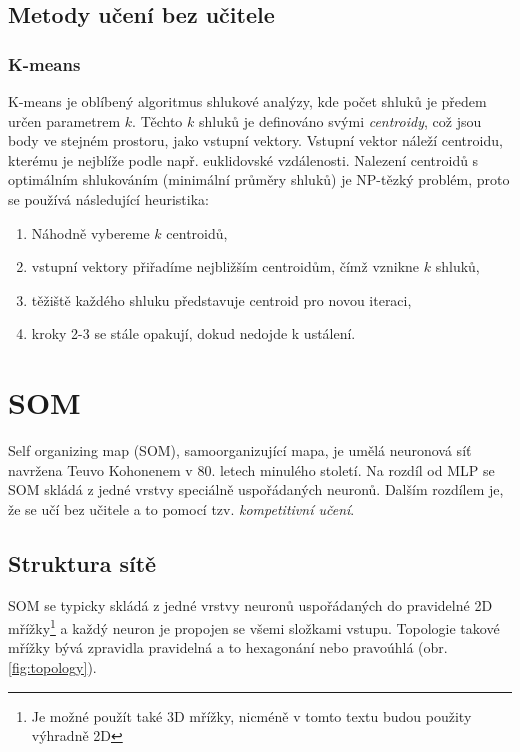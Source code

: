 \documentclass[thesis=M,czech]{FITthesis}[2012/06/26]
\begin{document}
 
 \subsection{Metody učení bez učitele}

  \subsubsection*{K-means}

K-means je oblíbený algoritmus shlukové analýzy, kde počet shluků je předem určen parametrem $k$. Těchto $k$ shluků je definováno svými \textit{centroidy}, což jsou body ve stejném prostoru, jako vstupní vektory. Vstupní vektor náleží centroidu, kterému je nejblíže podle např. euklidovské vzdálenosti. Nalezení centroidů s optimálním shlukováním (minimální průměry shluků) je NP-tězký problém\cite{k-means-nphard}, proto se  používá následující heuristika\cite{k-means-algo}:

\begin{enumerate}
\item Náhodně vybereme $k$ centroidů,
\item  vstupní vektory přiřadíme nejbližším centroidům, čímž vznikne $k$ shluků,
\item těžiště každého shluku představuje centroid pro novou iteraci,
\item kroky 2-3 se stále opakují, dokud nedojde k ustálení.
\end{enumerate}


\section{SOM}\label{sec:som_teo}
Self organizing map (SOM), samoorganizující mapa, je umělá neuronová síť navržena Teuvo Kohonenem v 80. letech minulého století. Na rozdíl od MLP se SOM skládá z jedné vrstvy speciálně uspořádaných neuronů. Dalším rozdílem je, že se učí bez učitele a to pomocí tzv. \textit{kompetitivní učení}.\cite{junkie}

\subsection{Struktura sítě}


SOM se typicky skládá z jedné vrstvy neuronů uspořádaných do pravidelné 2D mřížky\footnote{Je možné použít také 3D mřížky, nicméně v tomto textu budou použity výhradně 2D} a každý neuron je propojen se všemi složkami vstupu. Topologie takové mřížky bývá zpravidla pravidelná a to hexagonání nebo pravoúhlá (obr. \ref{fig:topology}).
\end{document}
